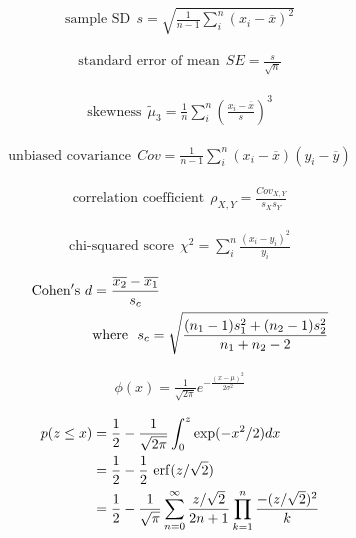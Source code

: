 \begin{align*} 
    \text{sample SD}~~s = \sqrt{\frac{1}{n-1}\sum_i^{n}(x_i-\overline{x})^2}
\end{align*}

\begin{align*} 
    \text{standard error of mean}~~SE = \frac{s}{\sqrt{n}}
\end{align*}

\begin{align*} 
    \text{skewness}~~\tilde{\mu}_3 = \frac{1}{n}\sum_i^{n}\left(\frac{x_i-\overline{x}}{s}\right)^3
\end{align*}

\begin{align*} 
    \text{unbiased covariance}~~Cov = \frac{1}{n-1}\sum_i^{n}(x_i-\overline{x})(y_i-\overline{y})
\end{align*}

\begin{align*} 
    \text{correlation coefficient}~~\rho_{X,Y} = \frac{Cov_{X,Y}}{s_{X}s_{Y}}
\end{align*}

\begin{align*} 
    \text{chi-squared score}~~\chi^2 = \sum_i^{n}\frac{(x_i-y_i)^2}{y_i}
\end{align*}

\begin{align*}
    {\rm Cohen's}~d &= \frac{\overline{x_2}-\overline{x_1}}{s_c} \\
    &\text{where}~~s_c = \sqrt{\frac{(n_1-1)s_1^2+(n_2-1)s_2^2}{n_1+n_2-2}}
\end{align*}


\begin{align*} 
    \phi(x) = \frac{1}{\sqrt{2\pi}}e^{-\frac{(x-\mu)^2}{2\sigma^2}}
\end{align*}

\begin{align*} 
    p(z \leq x) &= \frac{1}{2} - \frac{1}{\sqrt{2\pi}}\int_{0}^{z}\exp(-x^2/2)dx \\
    &= \frac{1}{2}-\frac{1}{2}~{\rm erf}(z/\sqrt{2}) \\
    &= \frac{1}{2}-\frac{1}{\sqrt{\pi}}\sum_{n=0}^{\infty}\frac{z/\sqrt{2}}{2n+1}\prod_{k=1}^{n}\frac{-(z/\sqrt{2})^2}{k}
\end{align*}

